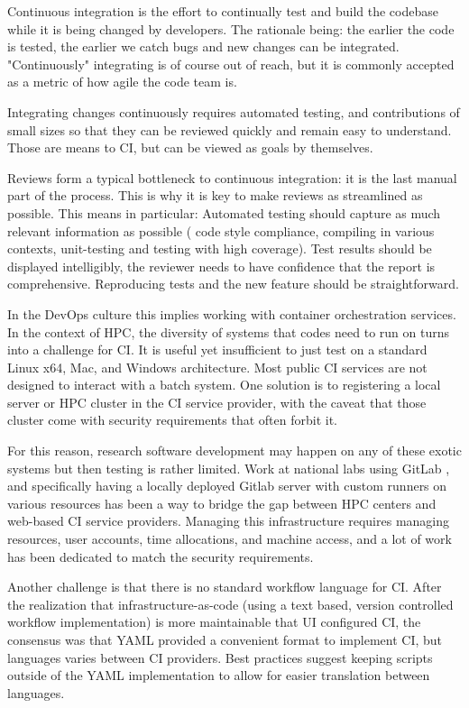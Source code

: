 Continuous integration is the effort to continually test and build the codebase
while it is being changed by developers. The rationale being: the earlier the
code is tested, the earlier we catch bugs and new changes can be integrated.
"Continuously" integrating is of course out of reach, but it is commonly
accepted as a metric of how agile the code team is.

Integrating changes continuously requires automated testing, and contributions
of small sizes so that they can be reviewed quickly and remain easy to
understand. Those are means to CI, but can be viewed as goals by themselves.

Reviews form a typical bottleneck to continuous integration: it is the
last manual part of the process. This is why it is key to make reviews as
streamlined as possible. This means in particular: Automated testing should
capture as much relevant information as possible ( code style compliance,
compiling in various contexts, unit-testing and testing with high coverage).
Test results should be displayed intelligibly, the reviewer needs to have
confidence that the report is comprehensive. Reproducing tests and the new
feature should be straightforward.

In the DevOps culture this implies working with container orchestration
services. In the context of HPC, the diversity of systems that codes need to
run on turns into a challenge for CI. It is useful yet insufficient to just
test on a standard Linux x64, Mac, and Windows architecture. Most public CI
services are not designed to interact with a batch system. One solution is to
registering a local server or HPC cluster in the CI service provider, with the
caveat that those cluster come with security requirements that often forbit it.

For this reason, research software development may happen on any of these
exotic systems but then testing is rather limited. Work at national labs using
GitLab \cite{Mendoza_undated-lz,noauthor_undated-fv}, and specifically having a
locally deployed Gitlab server with custom runners on various resources
\cite{noauthor_undated-jd} has been a way to bridge the gap between HPC centers
and web-based CI service providers. Managing this infrastructure requires
managing resources, user accounts, time allocations, and machine access, and
a lot of work has been dedicated to match the security requirements.

Another challenge is that there is no standard workflow language for CI.
After the realization that infrastructure-as-code (using a text based, version
controlled workflow implementation) is more maintainable that UI configured CI,
the consensus was that YAML provided a convenient format to implement CI, but
languages varies between CI providers. Best practices suggest keeping scripts
outside of the YAML implementation to allow for easier translation between
languages.
